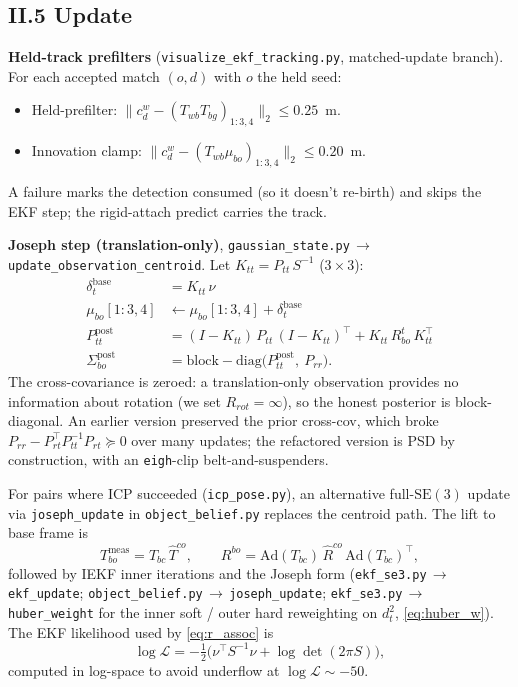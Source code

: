 \documentclass[11pt]{article}
\newcommand{\SE}{\mathrm{SE}(3)}
\newcommand{\Ad}{\mathrm{Ad}}
\newcommand{\file}[1]{\texttt{#1}}
\begin{document}
\subsection*{II.5 Update}

\textbf{Held-track prefilters} (\file{visualize\_ekf\_tracking.py},
matched-update branch). For each accepted match $(o,d)$ with $o$ the
held seed:
\begin{itemize}
\item Held-prefilter: $\|c_d^w - (T_{wb}T_{bg})_{1:3,4}\|_2 \le 0.25$~m.
\item Innovation clamp: $\|c_d^w - (T_{wb}\mu_{bo})_{1:3,4}\|_2 \le 0.20$~m.
\end{itemize}
A failure marks the detection consumed (so it doesn't re-birth) and
skips the EKF step; the rigid-attach predict carries the track.

\textbf{Joseph step (translation-only)}, \file{gaussian\_state.py}\,$\to$
\texttt{update\_observation\_centroid}. Let $K_{tt} = P_{tt}\,S^{-1}$ ($3\times 3$):
\begin{align*}
  \delta_t^{\text{base}} &= K_{tt}\,\nu \\
  \mu_{bo}[1{:}3, 4] &\leftarrow \mu_{bo}[1{:}3, 4] + \delta_t^{\text{base}} \\
  P_{tt}^{\text{post}} &= (I - K_{tt})\,P_{tt}\,(I - K_{tt})^\top + K_{tt}\,R_{bo}^t\,K_{tt}^\top \\
  \Sigma_{bo}^{\text{post}} &= \mathrm{block\!-\!diag}\bigl(P_{tt}^{\text{post}},\ P_{rr}\bigr).
\end{align*}
The cross-covariance is zeroed: a translation-only observation
provides no information about rotation (we set $R_{rot}=\infty$),
so the honest posterior is block-diagonal. An earlier version
preserved the prior cross-cov, which broke
$P_{rr}-P_{rt}^\top P_{tt}^{-1}P_{rt}\succeq 0$ over many updates;
the refactored version is PSD by construction, with an
\texttt{eigh}-clip belt-and-suspenders.

For pairs where ICP succeeded (\file{icp\_pose.py}), an alternative
full-$\SE$ update via \texttt{joseph\_update} in
\file{object\_belief.py} replaces the centroid path. The lift to base
frame is
\begin{equation}\label{eq:meas_compose}
T_{bo}^{\text{meas}} = T_{bc}\,\hat T^{co}, \qquad
R^{bo} = \Ad(T_{bc})\,\hat R^{co}\,\Ad(T_{bc})^\top,
\end{equation}
followed by IEKF inner iterations and the Joseph form
(\file{ekf\_se3.py}\,$\to$\,\texttt{ekf\_update};
\file{object\_belief.py}\,$\to$\,\texttt{joseph\_update};
\file{ekf\_se3.py}\,$\to$\,\texttt{huber\_weight} for the
inner soft / outer hard reweighting on $d^2_t$, \eqref{eq:huber_w}). The
EKF likelihood used by \eqref{eq:r_assoc} is
\begin{equation}\label{eq:ekf_lik}
\log\mathcal L = -\tfrac{1}{2}\bigl(\nu^\top S^{-1}\nu + \log\det(2\pi S)\bigr),
\end{equation}
computed in log-space to avoid underflow at $\log\mathcal L\sim -50$.
\end{document}
